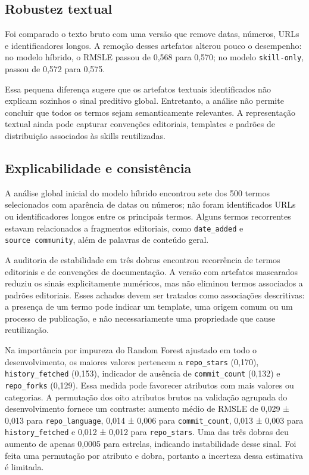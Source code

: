 \subsection{Robustez textual}\label{robustez-textual}

Foi comparado o texto bruto com uma versão que remove datas, números,
URLs e identificadores longos. A remoção desses artefatos alterou pouco
o desempenho: no modelo híbrido, o RMSLE passou de 0,568 para 0,570; no
modelo \texttt{skill-only}, passou de 0,572 para 0,575.

Essa pequena diferença sugere que os artefatos textuais identificados
não explicam sozinhos o sinal preditivo global. Entretanto, a análise
não permite concluir que todos os termos sejam semanticamente
relevantes. A representação textual ainda pode capturar convenções
editoriais, templates e padrões de distribuição associados às skills
reutilizadas.

\subsection{Explicabilidade e
consistência}\label{explicabilidade-e-consistuxeancia}

A análise global inicial do modelo híbrido encontrou sete dos 500 termos
selecionados com aparência de datas ou números; não foram identificados
URLs ou identificadores longos entre os principais termos. Alguns termos
recorrentes estavam relacionados a fragmentos editoriais, como
\texttt{date\_added} e \texttt{source\ community}, além de palavras de
conteúdo geral.

A auditoria de estabilidade em três dobras encontrou recorrência de
termos editoriais e de convenções de documentação. A versão com
artefatos mascarados reduziu os sinais explicitamente numéricos, mas não
eliminou termos associados a padrões editoriais. Esses achados devem ser
tratados como associações descritivas: a presença de um termo pode
indicar um template, uma origem comum ou um processo de publicação, e
não necessariamente uma propriedade que cause reutilização.

Na importância por impureza do Random Forest ajustado em todo o
desenvolvimento, os maiores valores pertencem a \texttt{repo\_stars}
(0,170), \texttt{history\_fetched} (0,153), indicador de ausência de
\texttt{commit\_count} (0,132) e \texttt{repo\_forks} (0,129). Essa
medida pode favorecer atributos com mais valores ou categorias. A
permutação dos oito atributos brutos na validação agrupada do
desenvolvimento fornece um contraste: aumento médio de RMSLE de 0,029 ±
0,013 para \texttt{repo\_language}, 0,014 ± 0,006 para
\texttt{commit\_count}, 0,013 ± 0,003 para \texttt{history\_fetched} e
0,012 ± 0,012 para \texttt{repo\_stars}. Uma das três dobras deu aumento
de apenas 0,0005 para estrelas, indicando instabilidade desse sinal. Foi
feita uma permutação por atributo e dobra, portanto a incerteza dessa
estimativa é limitada.


